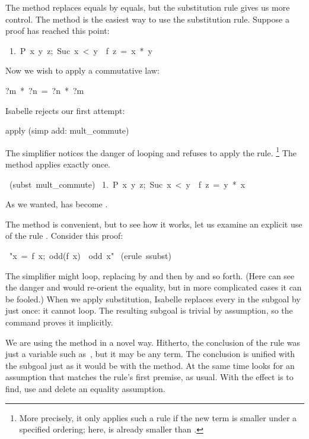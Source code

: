 The  method replaces equals by equals, but the substitution
rule gives us more control.  The  method is the easiest way to
use the substitution rule.  Suppose a
proof has reached this point:
\begin{isabelle}
\ 1.\ \isasymlbrakk P\ x\ y\ z;\ Suc\ x\ <\ y\isasymrbrakk \ \isasymLongrightarrow \ f\ z\ =\ x\ *\ y%
\end{isabelle}
Now we wish to apply a commutative law:
\begin{isabelle}
?m\ *\ ?n\ =\ ?n\ *\ ?m%
\end{isabelle}
Isabelle rejects our first attempt:
\begin{isabelle}
apply (simp add: mult_commute)
\end{isabelle}
The simplifier notices the danger of looping and refuses to apply the
rule.%
\footnote{More precisely, it only applies such a rule if the new term is
smaller under a specified ordering; here, 
is already smaller than
.}
%
The  method applies  exactly once.  
\begin{isabelle}
\ (subst\ mult_commute)\isanewline
\ 1.\ \isasymlbrakk P\ x\ y\ z;\ Suc\ x\ <\ y\isasymrbrakk \
\isasymLongrightarrow \ f\ z\ =\ y\ *\ x%
\end{isabelle}
As we wanted,  has become .

\medskip
The  method is convenient, but to see how it works, let us
examine an explicit use of the rule \isa{ssubst}.
Consider this proof: 
\begin{isabelle}
\
"\isasymlbrakk x\ =\ f\ x;\ odd(f\ x)\isasymrbrakk\ \isasymLongrightarrow\
odd\ x"\isanewline
\isacommand{by}\ (erule\ ssubst)
\end{isabelle}
%
The simplifier might loop, replacing  by  and then by
\isa{f(f x)} and so forth. (Here  
can see the danger and would re-orient the equality, but in more complicated
cases it can be fooled.) When we apply substitution,  Isabelle replaces every
\isa{x} in the subgoal by \isa{f x} just once: it cannot loop.  The
resulting subgoal is trivial by assumption, so the \isacommand{by} command
proves it implicitly. 

We are using the \isa{erule} method in a novel way. Hitherto, 
the conclusion of the rule was just a variable such as~, but it may
be any term. The conclusion is unified with the subgoal just as 
it would be with the \isa{rule} method. At the same time  looks 
for an assumption that matches the rule's first premise, as usual.  With
\isa{ssubst} the effect is to find, use and delete an equality 
assumption.


